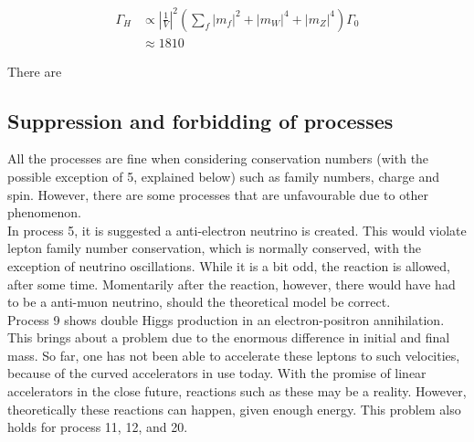 \documentclass[11pt,a4paper]{article}
\begin{document}
\begin{align*}
	\Gamma_H &\propto \left|\frac{1}{V}\right|^2\left(\sum_f |m_f|^2 + |m_W|^4 + |m_Z|^4\right)\Gamma_0\\
	&\approx  1810
\end{align*}

There are 

\subsection{Suppression and forbidding of processes}
All the processes are fine when considering conservation numbers (with the possible exception of 5, explained below) such as family numbers, charge and spin. However, there are some processes that are unfavourable due to other phenomenon.\\

In process 5, it is suggested a anti-electron neutrino is created. This would violate lepton family number conservation, which is normally conserved, with the exception of neutrino oscillations. While it is a bit odd, the reaction is allowed, after some time. Momentarily after the reaction, however, there would have had to be a anti-muon neutrino, should the theoretical model be correct.\\

Process 9 shows double Higgs production in an electron-positron annihilation. This brings about a problem due to the enormous difference in initial and final mass. So far, one has not been able to accelerate these leptons to such velocities, because of the curved accelerators in use today. With the promise of linear accelerators in the close future, reactions such as these may be a reality. However, theoretically these reactions can happen, given enough energy. This problem also holds for process 11, 12, and 20.


\end{document}

